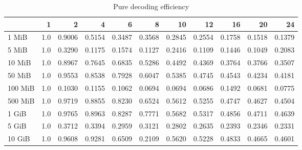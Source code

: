 \begin{table}[!h]
	\caption{Pure decoding efficiency}
	\begin{tabular}{lrrrrrrrrrr}
		\toprule
		\diagbox{File sizes }{Threads} &   1  &      2  &      4  &      6  &      8  &      10 &      12 &      16 &      20 &      24 \\
		\midrule
		1 MiB   &  1.0 &  0.9006 &  0.5154 &  0.3487 &  0.3568 &  0.2845 &  0.2554 &  0.1758 &  0.1518 &  0.1379 \\
		5 MiB   &  1.0 &  0.3290 &  0.1175 &  0.1574 &  0.1127 &  0.2416 &  0.1109 &  0.1446 &  0.1049 &  0.2083 \\
		10 MiB  &  1.0 &  0.8967 &  0.7645 &  0.6835 &  0.5286 &  0.4492 &  0.4369 &  0.3764 &  0.3766 &  0.3507 \\
		50 MiB  &  1.0 &  0.9553 &  0.8538 &  0.7928 &  0.6047 &  0.5385 &  0.4745 &  0.4543 &  0.4234 &  0.4181 \\
		100 MiB &  1.0 &  0.1030 &  0.1155 &  0.1062 &  0.0694 &  0.0694 &  0.0686 &  0.1492 &  0.0681 &  0.0775 \\
		500 MiB &  1.0 &  0.9719 &  0.8855 &  0.8230 &  0.6524 &  0.5612 &  0.5255 &  0.4747 &  0.4627 &  0.4504 \\
		1 GiB   &  1.0 &  0.9765 &  0.8963 &  0.8287 &  0.7771 &  0.5682 &  0.5317 &  0.4856 &  0.4711 &  0.4639 \\
		5 GiB   &  1.0 &  0.3712 &  0.3394 &  0.2959 &  0.3121 &  0.2802 &  0.2635 &  0.2393 &  0.2346 &  0.2331 \\
		10 GiB  &  1.0 &  0.9608 &  0.9281 &  0.6509 &  0.2109 &  0.5620 &  0.5228 &  0.4833 &  0.4665 &  0.4601 \\
		\bottomrule
	\end{tabular}
\end{table}